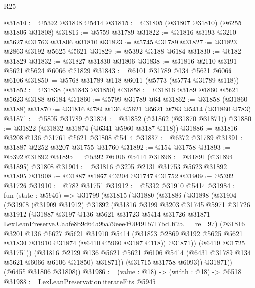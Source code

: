 \begin{lexlean}{R25}
\begin{coremodule}
@31810 := @5392 @31808 @5414
@31815 := @31805 (@31807 @31810) (@6255 @31806 @31808)
@31816 := @5759 @31789
@31822 := @31816 @3193 @3210 @5627 @31763 @31806 @31810
@31823 := @5745 @31789
@31827 := @31823 @2863 @3192 @5625 @5621
@31829 := @5392 @3188 @6184
@31830 := @6182 @31829
@31832 := @31827 @31830 @31806
@31838 := @31816 @2110 @3191 @5621 @5624 @6066 @31829
@31843 := @6101 @31789 @134 @5621 @6066 @6106
@31850 := @5768 @31789 @118 @6011 (@5773 (@5774 @31789 @118))
@31852 := @31838 (@31843 @31850)
@31858 := @31816 @3189 @1860 @5621 @5623 @3188 @6184
@31860 := @5799 @31789 @64
@31862 := @31858 (@31860 @3188)
@31870 := @31816 @784 @136 @5621 @5621 @783 @5414 (@31860 @783)
@31871 := @5805 @31789
@31874 := @31852 (@31862 (@31870 @31871))
@31880 := @31822 (@31832 @31874 (@6341 @5960 @3187 @118))
@31886 := @31816 @3208 @136 @31761 @5621 @31808 @5414
@31887 := @6372 @31789
@31891 := @31887 @2252 @3207 @31755 @31760
@31892 := @154 @31758
@31893 := @5392 @31892
@31895 := @5392 @6106 @5414
@31898 := @31891 (@31893 @31895) @31808
@31904 := @31816 @3205 @2131 @31753 @5623 @31892 @31895
@31908 := @31887 @1867 @3204 @31747 @31752
@31909 := @5392 @31726
@31910 := @782 @31751
@31912 := @5392 @31910 @5414
@31984 := fun (state : @5946) =>
  @31799
    (@31815
      (@31880
        (@31886
          (@31898
            (@31904
              (@31908
                (@31909 @31912)
                @31892
                (@31816
                  @3199
                  @3203
                  @31745
                  @5971
                  @31726
                  @31912
                  (@31887
                    @3197
                    @136
                    @5621
                    @31723
                    @5414
                    @31726
                    @31871
                    LexLeanPreserve.Ca5fe8b9d64595a79eee4f004915717bd.R25.__rel_97)
                  (@31816
                    @3201
                    @136
                    @5627
                    @5621
                    @31910
                    @5414
                    (@31823 @2869 @3192 @5625 @5621 @31830 @31910 @31874 (@6410 @5960 @3187 @118))
                    @31871))
                (@6419 @31725 @31751))
              (@31816
                @2129
                @136
                @5621
                @5621
                @6106
                @5414
                (@6431 @31789 @134 @5621 @6066 @6106 @31850)
                @31871))
            (@31715 @31758 @6093))
          @31871))
      (@6455 @31806 @31808))
@31986 := (value : @18) -> (width : @18) -> @5518
@31988 := LexLeanPreservation.iterateFits @5946

\end{coremodule}
\end{lexlean}
